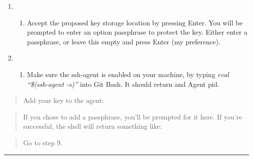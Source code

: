 \documentclass[12pt,]{article}
\providecommand{\tightlist}{%
  \setlength{\itemsep}{0pt}\setlength{\parskip}{0pt}}
\begin{document}
\begin{quote}
\colorbox{light-gray}{}
\end{quote}

\begin{enumerate}
\def\labelenumi{\arabic{enumi}.}
\setcounter{enumi}{6}
\item
  \begin{enumerate}
  \def\labelenumii{\alph{enumii}.}
  \setcounter{enumii}{1}
  \tightlist
  \item
    Accept the proposed key storage location by pressing Enter. You will
    be prompted to enter an option passphrase to protect the key. Either
    enter a passphrase, or leave this empty and press Enter (my
    preference).
  \end{enumerate}
\item
  \begin{enumerate}
  \def\labelenumii{\alph{enumii}.}
  \setcounter{enumii}{1}
  \tightlist
  \item
    Make sure the ssh-agent is enabled on your machine, by typing
    \emph{eval ``\$(ssh-agent -s)''} into Git Bash. It should return and
    Agent pid.
  \end{enumerate}
\end{enumerate}

\begin{quote}
Add your key to the agent:
\end{quote}

\begin{quote}
\colorbox{light-gray}{}
\end{quote}

\begin{quote}
If you chose to add a passphrase, you'll be prompted for it here. If
you're successful, the shell will return something like:
\end{quote}

\begin{quote}
\colorbox{light-gray}{}
\end{quote}

\begin{quote}
Go to step 9.
\end{quote}

\begin{center}\rule{0.5\linewidth}{\linethickness}\end{center}
\end{document}
